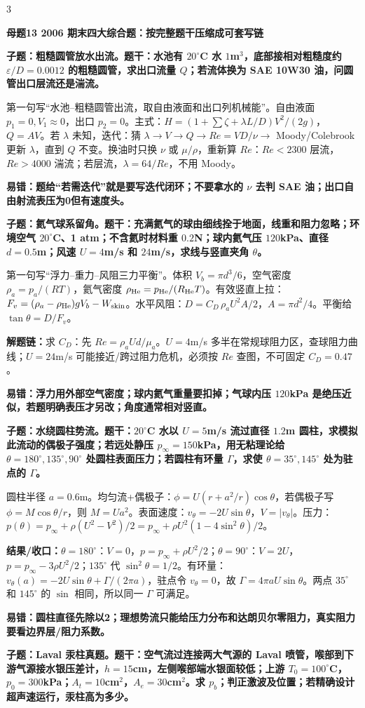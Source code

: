 \documentclass[a4paper]{article}
\newcommand{\mt}[1]{\vspace{0.22pt}\colorbox{M}{\parbox{\dimexpr\linewidth-2\fboxsep}{\color{white}\bfseries #1}}\par}
\newcommand{\qt}[1]{\vspace{0.10pt}\colorbox{Q}{\parbox{\dimexpr\linewidth-2\fboxsep}{\color{white}\bfseries #1}}\par}
\newcommand{\ans}[1]{\colorbox{G}{\parbox{\dimexpr\linewidth-2\fboxsep}{#1}}\par}
\newcommand{\warn}[1]{\colorbox{Y}{\parbox{\dimexpr\linewidth-2\fboxsep}{\color{E}\bfseries #1}}\par}
\newcommand{\chain}[1]{{\color{A}\bfseries 解题链：}#1\par}
\newcommand{\res}[1]{{\color{E}\bfseries 结果/收口：}#1\par}
\begin{document}
\begin{multicols}{3}
\mt{母题13 2006 期末四大综合题：按完整题干压缩成可套写链}
\qt{子题：粗糙圆管放水出流。题干：水池有 $20^\circ$C 水 $1$m$^3$，底部接相对粗糙度约 $\varepsilon/D=0.0012$ 的粗糙圆管，求出口流量 $Q$；若流体换为 SAE 10W30 油，问圆管出口层流还是湍流。}
\ans{第一句写“水池--粗糙圆管出流，取自由液面和出口列机械能”。自由液面 $p_1=0,V_1\approx0$，出口 $p_2=0$。主式：$H=(1+\sum\zeta+\lambda L/D)V^2/(2g)$，$Q=AV$。若 $\lambda$ 未知，迭代：猜 $\lambda\to V\to Q\to Re=VD/\nu\to$ Moody/Colebrook 更新 $\lambda$，直到 $Q$ 不变。换油时只换 $\nu$ 或 $\mu/\rho$，重新算 $Re$：$Re<2300$ 层流，$Re>4000$ 湍流；若层流，$\lambda=64/Re$，不用 Moody。}
\warn{易错：题给“若需迭代”就是要写迭代闭环；不要拿水的 $\nu$ 去判 SAE 油；出口自由射流表压为0但有速度头。}
\qt{子题：氦气球系留角。题干：充满氦气的球由细线拴于地面，线重和阻力忽略；环境空气 $20^\circ$C、1 atm；不含氦时材料重 $0.2$N；球内氦气压 $120$kPa、直径 $d=0.5$m；风速 $U=4$m/s 和 $24$m/s，求线与竖直夹角 $\theta$。}
\ans{第一句写“浮力--重力--风阻三力平衡”。体积 $V_b=\pi d^3/6$，空气密度 $\rho_a=p_a/(RT)$，氦气密度 $\rho_{\rm He}=p_{\rm He}/(R_{\rm He}T)$。有效竖直上拉：$F_v=(\rho_a-\rho_{\rm He})gV_b-W_{\rm skin}$。水平风阻：$D=C_D\,\rho_aU^2A/2$，$A=\pi d^2/4$。平衡给 $\tan\theta=D/F_v$。}
\chain{求 $C_D$：先 $Re=\rho_aUd/\mu_a$。$U=4$m/s 多半在常规球阻力区，查球阻力曲线；$U=24$m/s 可能接近/跨过阻力危机，必须按 $Re$ 查图，不可固定 $C_D=0.47$。}
\warn{易错：浮力用外部空气密度；球内氦气重量要扣掉；气球内压 $120$kPa 是绝压近似，若题明确表压才另改；角度通常相对竖直。}
\qt{子题：水绕圆柱势流。题干：$20^\circ$C 水以 $U=5$m/s 流过直径 $1.2$m 圆柱，求模拟此流动的偶极子强度；若远处静压 $p_\infty=150$kPa，用无粘理论给 $\theta=180^\circ,135^\circ,90^\circ$ 处圆柱表面压力；若圆柱有环量 $\Gamma$，求使 $\theta=35^\circ,145^\circ$ 处为驻点的 $\Gamma$。}
\ans{圆柱半径 $a=0.6$m。均匀流+偶极子：$\phi=U(r+a^2/r)\cos\theta$，若偶极子写 $\phi=M\cos\theta/r$，则 $M=Ua^2$。表面速度：$v_\theta=-2U\sin\theta$，$V=|v_\theta|$。压力：$p(\theta)=p_\infty+\rho(U^2-V^2)/2=p_\infty+\rho U^2(1-4\sin^2\theta)/2$。}
\res{$\theta=180^\circ$：$V=0$，$p=p_\infty+\rho U^2/2$；$\theta=90^\circ$：$V=2U$，$p=p_\infty-3\rho U^2/2$；$135^\circ$ 代 $\sin^2\theta=1/2$。有环量：$v_\theta(a)=-2U\sin\theta+\Gamma/(2\pi a)$，驻点令 $v_\theta=0$，故 $\Gamma=4\pi aU\sin\theta$。两点 $35^\circ$ 和 $145^\circ$ 的 $\sin$ 相同，所以同一 $\Gamma$ 可满足。}
\warn{易错：圆柱直径先除以2；理想势流只能给压力分布和达朗贝尔零阻力，真实阻力要看边界层/阻力系数。}
\qt{子题：Laval 汞柱真题。题干：空气流过连接两大气源的 Laval 喷管，喉部到下游气源接水银压差计，$h=15$cm，左侧喉部端水银面较低；上游 $T_0=100^\circ$C，$p_0=300$kPa；$A_t=10$cm$^2$，$A_e=30$cm$^2$。求 $p_b$；判正激波及位置；若精确设计超声速运行，汞柱高为多少。}

\end{multicols}
\end{document}
